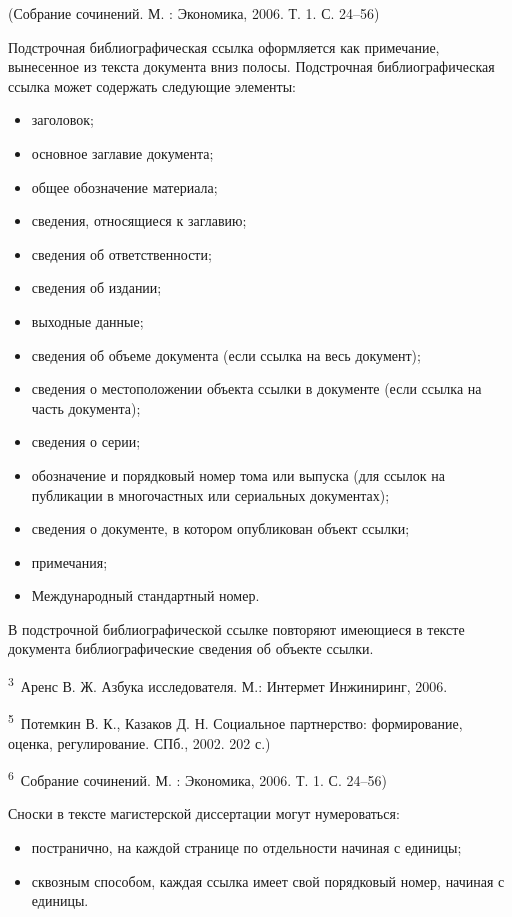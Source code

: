 \documentclass[12pt,a4paper, oneside]{extreport}
\begin{document}
(Собрание сочинений. М. : Экономика, 2006.  Т. 1. С. 24–56)



Подстрочная библиографическая ссылка оформляется как примечание, вынесенное из текста документа вниз полосы.
Подстрочная библиографическая ссылка может содержать следующие элементы:
\begin{itemize}
\item заголовок;
\item основное заглавие документа;
\item общее обозначение материала;
\item сведения, относящиеся к заглавию;
\item сведения об ответственности;
\item сведения об издании;
\item выходные данные;
\item сведения об объеме документа (если ссылка на весь документ);
\item сведения о местоположении объекта ссылки в документе (если ссылка на часть документа);
\item сведения о серии;
\item обозначение и порядковый номер тома или выпуска (для ссылок на публикации в многочастных или сериальных документах);
\item сведения о документе, в котором опубликован объект ссылки; 
\item примечания;
\item Международный стандартный номер.
\end{itemize}

В подстрочной библиографической ссылке повторяют имеющиеся в тексте документа библиографические сведения об объекте ссылки. 

\textsuperscript{3}~Аренс В. Ж. Азбука исследователя. М.: Интермет Инжиниринг, 2006.

\textsuperscript{5}~Потемкин В. К., Казаков Д. Н. Социальное партнерство: формирование, оценка, регулирование. СПб., 2002. 202 с.)

\textsuperscript{6}~Собрание сочинений. М. : Экономика, 2006.  Т. 1. С. 24–56)

Сноски в тексте магистерской диссертации могут нумероваться:
\begin{itemize}
\item постранично, на каждой странице по отдельности начиная с единицы;
\item сквозным способом, каждая ссылка имеет свой порядковый номер, начиная с единицы. 
\end{itemize}
\end{document}

